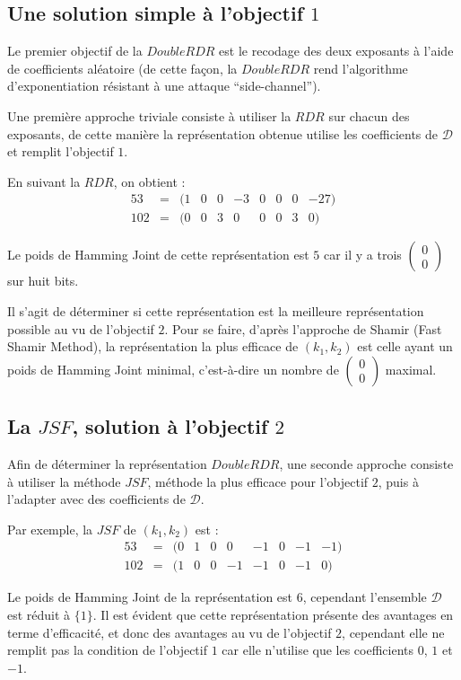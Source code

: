 \documentclass[12pt, a4paper]{memoir}
\newcommand{\doublezero}{\begin{pmatrix} 0 \\ 0 \end{pmatrix}}
\begin{document}
\subsection{Une solution simple à l'objectif $1$}

Le premier objectif de la $DoubleRDR$ est le recodage des deux exposants à l'aide de coefficients aléatoire
(de cette façon, la $DoubleRDR$ rend l'algorithme d'exponentiation résistant à une attaque ``side-channel'').

Une première approche triviale consiste à utiliser la $RDR$ sur chacun des exposants, de cette manière 
la représentation obtenue utilise les coefficients de $\mathcal{D}$ et remplit l'objectif $1$.

En suivant la $RDR$, on obtient : \\
  $$\begin{array}{cccccccccc}
  53 & = & (1 & 0 & 0 & -3 & 0 & 0 & 0 & -27) \\
  102 & = & (0 & 0 & 3 & 0 & 0 & 0 & 3 & 0)
 \end{array}$$

 Le poids de Hamming Joint de cette représentation est $5$ car il y a trois $\doublezero$ sur huit bits.
 
 Il s'agit de déterminer si cette représentation est la meilleure représentation possible au vu de l'objectif $2$.
 Pour se faire, d'après l'approche de Shamir (Fast Shamir Method), la représentation la plus efficace de $(k_1,k_2)$
 est celle ayant un poids de Hamming Joint minimal, c'est-à-dire un nombre de $\doublezero$ maximal.

\subsection{La $JSF$, solution à l'objectif $2$}

Afin de déterminer la représentation $DoubleRDR$, une seconde approche consiste à utiliser la méthode $JSF$,
méthode la plus efficace pour l'objectif $2$, puis à l'adapter avec des coefficients de $\mathcal{D}$.

Par exemple, la $JSF$ de $(k_1,k_2)$ est : \\
  $$\begin{array}{cccccccccc}
  53 & = & (0 & 1 & 0 & 0 & -1 & 0 & -1 & -1) \\
  102 & = & (1 & 0 & 0 & -1 & -1 & 0 & -1 & 0)
 \end{array}$$
 
 Le poids de Hamming Joint de la représentation est $6$, cependant l'ensemble $\mathcal{D}$ est réduit
 à $\{1\}$. Il est évident que cette représentation présente des avantages en terme d'efficacité, et donc
 des avantages au vu de l'objectif $2$, cependant elle ne remplit pas la condition de l'objectif $1$ car elle
 n'utilise que les coefficients $0$, $1$ et $-1$.
 
\end{document}
